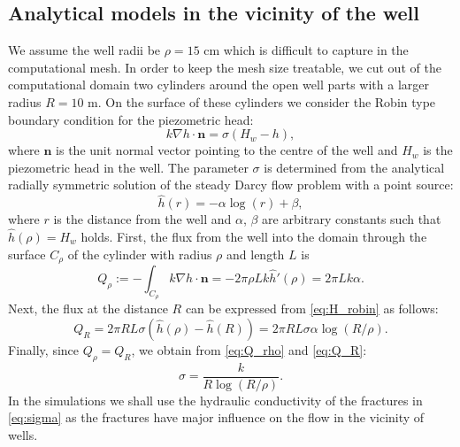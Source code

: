 \documentclass{article}
\newcommand{\eq}[1]{\begin{equation}#1\end{equation}}
\newcommand{\nn}{\vc n}
\newcommand{\vc}[1]{\boldsymbol{#1}}
\begin{document}




\subsection{Analytical models in the vicinity of the well}
We assume the well radii be $\rho = 15$ cm which is difficult to capture in the computational mesh.
In order to keep the mesh size treatable, we cut out of the computational domain two cylinders around the open well parts with a larger radius $R=10$ m.
On the surface of these cylinders we consider the Robin type boundary condition for the piezometric head:
%
\eq{\label{eq:H_robin} k\nabla h\cdot\nn = \sigma(H_w-h), }
%
where $\nn$ is the unit normal vector pointing to the centre of the well and $H_w$ is the piezometric head in the well.
The parameter $\sigma$ is determined from the analytical radially symmetric solution
of the steady Darcy flow problem with a point source:
\[
    \hat h(r) = -\alpha \log (r) + \beta,
\]
where $r$ is the distance from the well and $\alpha$, $\beta$ are arbitrary constants such that $\hat h(\rho)=H_w$ holds.
First, the flux from the well into the domain through the surface $C_\rho$ of the cylinder with radius $\rho$ and length $L$ is
%  
\eq{\label{eq:Q_rho}    Q_\rho := -\int_{C_\rho} k\nabla h\cdot\nn = -2\pi \rho L k \hat h'(\rho) = 2\pi L k \alpha. }
%
Next, the flux at the distance $R$ can be expressed from \eqref{eq:H_robin} as follows:
%
\eq{\label{eq:Q_R}   Q_R = 2\pi R L \sigma (\hat h(\rho) - \hat h(R)) = 2\pi R L \sigma \alpha \log(R/\rho).}
%
Finally, since $Q_\rho=Q_R$, we obtain from \eqref{eq:Q_rho} and \eqref{eq:Q_R}:
\eq{ \label{eq:sigma} \sigma = \frac{k}{R\log(R/\rho)}. }
In the simulations we shall use the hydraulic conductivity of the fractures in \eqref{eq:sigma} as the fractures have major influence on the flow in the vicinity of wells.
\end{document}
